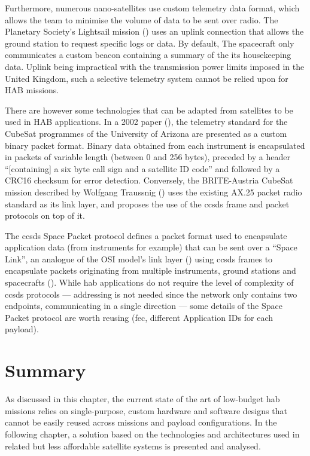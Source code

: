 Furthermore, numerous nano-satellites use custom telemetry data format, which allows the team to minimise the volume of data to be sent over radio. The Planetary Society's Lightsail mission (\cite{planetary2016}) uses an uplink connection that allows the ground station to request specific logs or data. By default, The spacecraft only communicates a custom beacon containing a summary of the its housekeeping data. Uplink being impractical with the transmission power limits imposed in the United Kingdom, such a selective telemetry system cannot be relied upon for HAB missions.

There are however some technologies that can be adapted from satellites to be used in HAB applications. In a 2002 paper (\cite{Eatchel2002}), the telemetry standard for the CubeSat programmes of the University of Arizona are presented as a custom binary packet format. Binary data obtained from each instrument is encapsulated in packets of variable length (between 0 and 256 bytes), preceded by a header ``[containing] a six byte call sign and a satellite ID code'' and followed by a CRC16 checksum for error detection. Conversely, the BRITE-Austria CubeSat mission described by Wolfgang Traussnig (\cite{Traussnig2007}) uses the existing AX.25 packet radio standard as its link layer, and proposes the use of the \acrshort{ccsds} frame and packet protocols on top of it.

The \acrshort{ccsds} Space Packet protocol defines a packet format used to encapsulate application data (from instruments for example) that can be sent over a ``Space Link'', an analogue of the OSI model's link layer (\cite{Stallings1987}) using \acrshort{ccsds} frames to encapsulate packets originating from multiple instruments, ground stations and spacecrafts (\cite{ccsds2003}). While \acrlong{hab} applications do not require the level of complexity of \acrshort{ccsds} protocols — addressing is not needed since the network only contains two endpoints, communicating in a single direction — some details of the Space Packet protocol are worth reusing (\acrfull{fec}, different Application IDs for each payload).


\section{Summary}

As discussed in this chapter, the current state of the art of low-budget \acrlong{hab} missions relies on single-purpose, custom hardware and software designs that cannot be easily reused across missions and payload configurations. In the following chapter, a solution based on the technologies and architectures used in related but less affordable satellite systems is presented and analysed.